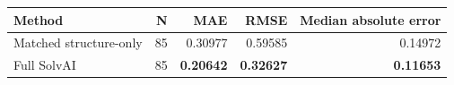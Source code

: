 \begin{tabular}{lrrrr}
\toprule
Method & N & MAE & RMSE & Median absolute error \\
\midrule
Matched structure-only & 85 & 0.30977 & 0.59585 & 0.14972 \\
Full SolvAI & 85 & \textbf{0.20642} & \textbf{0.32627} & \textbf{0.11653} \\
\bottomrule
\end{tabular}
